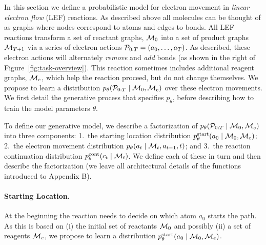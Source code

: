 


In this section we define a probabilistic model for electron movement in \emph{linear electron flow} (LEF) reactions.
As described above all molecules can be thought of as graphs where nodes correspond to atoms and edges to bonds. All LEF reactions transform a set of reactant graphs, ${\mathcal{M}}_0$ into a set of product graphs ${\mathcal{M}}_{T+1}$ via a series of electron actions ${\mathcal{P}}_{0:T} = (a_0, \dots, a_{T})$.  As described, these electron actions will alternately \emph{remove} and \emph{add} bonds (as shown in the right of Figure~\ref{fig:task-overview}). This reaction sometimes includes additional reagent graphs, ${\mathcal{M}}_e$, which help the reaction proceed, but do not change themselves.
We propose to learn a distribution $p_\theta( {\mathcal{P}}_{0:T} \mid {\mathcal{M}}_0, {\mathcal{M}}_e)$ over these electron movements. 
We first detail the generative process %
that specifies $p_\theta$, before describing how to train the model parameters $\theta$.




To define our generative model, we describe a factorization of $p_\theta( {\mathcal{P}}_{0:T} \mid {\mathcal{M}}_0, {\mathcal{M}}_e)$ into three components: 1.\ the starting location distribution $p_\theta^{\mathrm{start}}(a_0 \mid {\mathcal{M}}_0, {\mathcal{M}}_e)$; 2.\ the electron movement distribution $p_\theta(a_t \mid {\mathcal{M}}_{t}, a_{t-1}, t)$; and 3.\ the reaction continuation distribution $p^\textrm{cont}_\theta(c_{t} \mid {\mathcal{M}}_{t})$. We define each of these in turn and then describe the factorization (we leave all architectural details of the functions introduced to Appendix B).

\paragraph{Starting Location.}
At the beginning the reaction needs to decide on which atom $a_0$ starts the path.
As this is based on (i) the initial set of reactants ${\mathcal{M}}_0$ and possibly (ii) a set of reagents ${\mathcal{M}}_e$,
we propose to learn a distribution $p_\theta^{\mathrm{start}}(a_0 \mid {\mathcal{M}}_0, {\mathcal{M}}_e)$.

